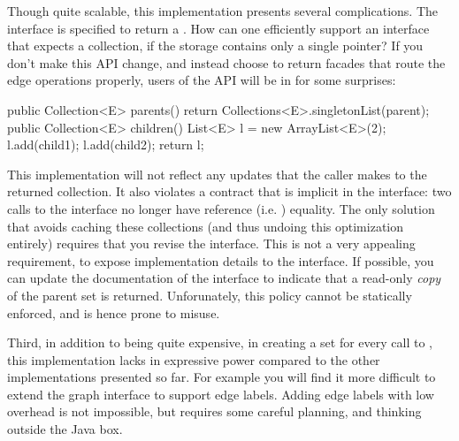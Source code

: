 Though quite scalable, this implementation presents several complications.
The  interface is specified to return a
. How can one efficiently support an interface that expects a
collection, if the storage contains only a single pointer? If you don't make
this API change, and instead choose to return facades that route the edge
operations properly, users of the API will be in for some surprises:
\begin{shortlisting}
public Collection<E> parents() {
   return Collections<E>.singletonList(parent);
}
public Collection<E> children() {
   List<E> l = new ArrayList<E>(2);
   l.add(child1); l.add(child2);
   return l;
}
\end{shortlisting}
This implementation will not reflect any updates that the caller makes to the
returned collection. It also violates a contract that is implicit in the
interface: two calls to the  interface no longer have
reference (i.e. \code{==}) equality.
The only solution that avoids caching these collections (and thus undoing this
optimization entirely) requires that you revise the 
interface. This is not a very appealing requirement, to expose implementation
details to the interface.
If possible, you can update the 
documentation of the  interface 
to indicate that a read-only
\emph{copy} of the parent set is returned. Unforunately, this
policy cannot be statically enforced, and is hence prone to misuse.

Third, in addition to being quite expensive, in creating a set for every call to
, this implementation lacks in expressive power compared to the
other implementations presented so far. For example you will find it more
difficult to extend the graph interface to support edge labels. Adding edge
labels with low overhead is not impossible, but requires some careful planning,
and thinking outside the Java box.

